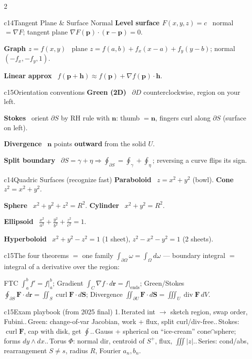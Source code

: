 \documentclass[10pt]{extarticle}
\newcommand{\h}[1]{{\bfseries #1}\ }
\newcommand{\key}[1]{\colorbox{hl}{$#1$}}
\newcommand{\grad}{\nabla}
\renewcommand{\div}{\operatorname{div}}
\newcommand{\curl}{\operatorname{curl}}
\newcommand{\F}{\mathbf{F}}
\newcommand{\n}{\mathbf{n}}
\newcommand{\rr}{\mathbf{r}}
\begin{document}
\begin{multicols}{2}
\begin{tbox}{c14}{Tangent Plane \& Surface Normal}
\h{Level surface $F(x,y,z)=c$} normal $=\grad F$; tangent plane $\grad F(\mathbf p)\cdot(\mathbf r-\mathbf p)=0$.\par
\h{Graph $z=f(x,y)$} plane $z=f(a,b)+f_x(x{-}a)+f_y(y{-}b)$; normal $(-f_x,-f_y,1)$.\par
\h{Linear approx} $f(\mathbf p+\mathbf h)\approx f(\mathbf p)+\grad f(\mathbf p)\cdot\mathbf h$.
\end{tbox}

\begin{tbox}{c15}{Orientation conventions}
\h{Green (2D)} $\partial D$ counterclockwise, region on your left.\par
\h{Stokes} orient $\partial S$ by RH rule with $\n$: thumb $=\n$, fingers curl along $\partial S$ (surface on left).\par
\h{Divergence} $\n$ points \textbf{outward} from the solid $U$.\par
\h{Split boundary} $\partial S=\gamma+\eta\Rightarrow\oint_{\partial S}=\oint_\gamma+\oint_\eta$; reversing a curve flips its sign.
\end{tbox}

\begin{tbox}{c14}{Quadric Surfaces (recognize fast)}
\h{Paraboloid} $z=x^2+y^2$ (bowl). \h{Cone} $z^2=x^2+y^2$.\par
\h{Sphere} $x^2{+}y^2{+}z^2{=}R^2$. \h{Cylinder} $x^2{+}y^2{=}R^2$.\par
\h{Ellipsoid} $\tfrac{x^2}{a^2}{+}\tfrac{y^2}{b^2}{+}\tfrac{z^2}{c^2}{=}1$.\par
\h{Hyperboloid} $x^2{+}y^2{-}z^2{=}1$ (1 sheet), $z^2{-}x^2{-}y^2{=}1$ (2 sheets).
\end{tbox}

\begin{tbox}{c15}{The four theorems $=$ one family}
\key{\textstyle\int_{\partial\Omega}\omega=\int_\Omega d\omega} — boundary integral $=$ integral of a derivative over the region:\par
FTC $\int_a^b f'=f|_a^b$;\; Gradient $\int_C\grad f\cdot d\rr=f|_{\text{ends}}$;\; Green/Stokes $\oint_{\partial S}\F\cdot d\rr=\iint_S\curl\F\cdot d\mathbf S$;\; Divergence $\iint_{\partial U}\F\cdot d\mathbf S=\iiint_U\div\F\,dV$.
\end{tbox}

\begin{tbox}{c15}{Exam playbook (from 2025 final)}
\footnotesize
1.\,Iterated int $\to$ sketch region, swap order, Fubini..\,Green: change-of-var Jacobian, work + flux, split curl/div-free..\,Stokes: $\curl\F$, cap with disk, get $\oint$..\,Gauss + spherical on ``ice-cream'' cone$\cap$sphere; forms $dy\wedge dx$..\,Torus $\Phi$: normal dir, centroid of $S^+$, flux, $\iiint|z|$..\,Series: cond/abs, rearrangement $S\neq s$, radius $R$, Fourier $a_n,b_n$.
\end{tbox}

\end{multicols}
\end{document}
